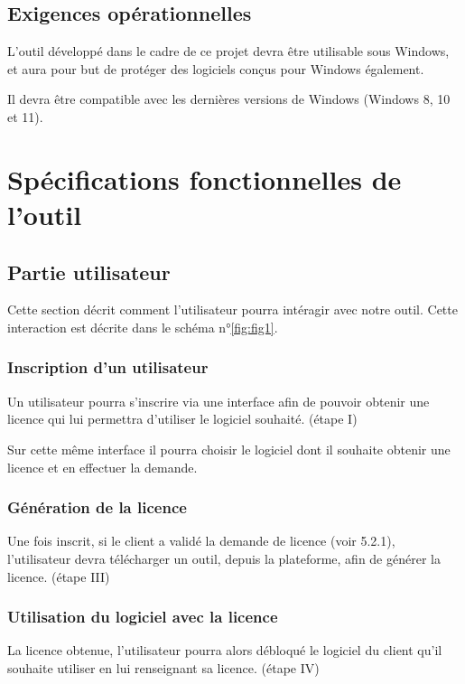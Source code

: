\section{Exigences opérationnelles}

L'outil développé dans le cadre de ce projet devra être utilisable sous Windows, et aura pour but de protéger des logiciels conçus pour Windows également.

Il devra être compatible avec les dernières versions de Windows (Windows 8, 10 et 11).

\chapter{Spécifications fonctionnelles de l'outil}

\section{Partie utilisateur}

Cette section décrit comment l'utilisateur pourra intéragir avec notre outil. Cette interaction est décrite dans le schéma n°\ref{fig:fig1}.

\subsection{Inscription d'un utilisateur}

Un utilisateur pourra s'inscrire via une interface afin de pouvoir obtenir une licence qui lui permettra d'utiliser le logiciel souhaité. (étape I)

Sur cette même interface il pourra choisir le logiciel dont il souhaite obtenir une licence et en effectuer la demande.

\subsection{Génération de la licence}

Une fois inscrit, si le client a validé la demande de licence (voir 5.2.1), l'utilisateur devra télécharger un outil, depuis la plateforme, afin de générer la licence. (étape III)

\subsection{Utilisation du logiciel avec la licence}

La licence obtenue, l'utilisateur pourra alors débloqué le logiciel du client qu'il souhaite utiliser en lui renseignant sa licence. (étape IV)

